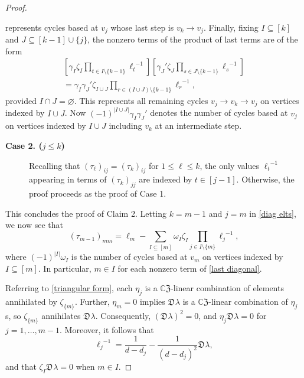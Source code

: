 \documentclass{article}
\theoremstyle{definition}
\newcommand{\zdu}{\mathfrak{D}\mspace{1mu}}
\newcommand{\CZ}{\mathbb{C}\mathfrak{Z}}
\numberwithin{equation}{section}
\begin{document}
\begin{proof}
\begin{description}
represents cycles based at $v_j$ whose last step is $v_k\to v_j$.
Finally, fixing $I\subseteq[k]$ and $J\subseteq[k-1]\cup\{j\}$,  the nonzero terms of the product of last terms are of the form
\begin{align}
\left[\gamma_I\zeta_I\prod_{t\in I\setminus\{k-1\}}{\ell_t}^{-1}\right]
\left[{\gamma_J}'\zeta_J\prod_{s\in J\setminus\{k-1\}}{\ell_s}^{-1}\right]\nonumber\\
=\gamma_I{\gamma_J}'\zeta_{I\cup J}\prod_{r\in (I\cup J)\setminus\{k-1\}}{\ell_r}^{-1},\end{align}
provided $I\cap J=\varnothing$.  This represents all remaining cycles $v_j\to v_k\to v_j$ on vertices indexed by $I\cup J$.  Now $(-1)^{|I\cup J|}\gamma_I{\gamma_J}'$ denotes the number of cycles based at $v_j$ on vertices indexed by $I\cup J$ including $v_k$ at an intermediate step.  
\end{description}

\begin{description}
\item [{\bf Case 2. ($j\le k$)}]
Recalling that $(\tau_\ell)_{ij}=(\tau_k)_{ij}$ for $1\le \ell\le k$, the only values ${\ell_t}^{-1}$ appearing in terms of $(\tau_k)_{jj}$ are indexed by $t\in [j-1]$.  Otherwise, the proof proceeds as the proof of Case 1.
\end{description}
This concludes the proof of Claim 2.  Letting $k=m-1$ and $j=m$ in \eqref{diag elts}, we now see that  \begin{equation}\label{last diagonal}
(\tau_{m-1})_{mm}=\ell_m-\sum_{I\subseteq [m]}\omega_I\zeta_I\prod_{j\in I\setminus\{m\}}{\ell_j}^{-1},
\end{equation}
where $(-1)^{|I|}\omega_I$ is the number of cycles based at $v_m$ on vertices indexed by $I\subseteq [m]$.  In particular, $m\in I$ for each nonzero term of \eqref{last diagonal}.

Referring to \eqref{triangular form}, each $\eta_j$ is a $\CZ$-linear combination of elements annihilated by $\zeta_{\{m\}}$.  Further, $\eta_m=0$ implies $\zdu\lambda$ is a $\CZ$-linear combination of $\eta_j$s, so $\zeta_{\{m\}}$ annihilates $\zdu\lambda$.  Consequently,  $(\zdu \lambda)^2=0$, and $\eta_j\zdu\lambda=0$ for $j=1, \ldots, m-1$.  Moreover,  it follows that \begin{equation*}
{\ell_j}^{-1}=\frac{1}{d-d_j}-\frac{1}{(d-d_j)^2}\zdu\lambda,
\end{equation*}
and that $\zeta_I\zdu\lambda =0$ when $m\in I$. 


\end{proof}
\end{document}
